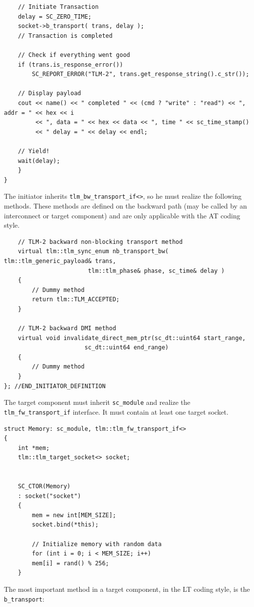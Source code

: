 \documentclass[11pt]{article}
\begin{document}
\begin{verbatim}
	// Initiate Transaction
	delay = SC_ZERO_TIME;
	socket->b_transport( trans, delay );
	// Transaction is completed

	// Check if everything went good
	if (trans.is_response_error())
	    SC_REPORT_ERROR("TLM-2", trans.get_response_string().c_str());

	// Display payload
	cout << name() << " completed " << (cmd ? "write" : "read") << ", addr = " << hex << i
	     << ", data = " << hex << data << ", time " << sc_time_stamp()
	     << " delay = " << delay << endl;

	// Yield!
	wait(delay);
    }
}
\end{verbatim}
The initiator inherits \texttt{tlm\_bw\_transport\_if<>}, so he must realize the following methods.
These methods are defined on the backward path (may be called by an interconnect or target component) and are only applicable with the AT coding style.
\begin{verbatim}
    // TLM-2 backward non-blocking transport method
    virtual tlm::tlm_sync_enum nb_transport_bw( tlm::tlm_generic_payload& trans,
						tlm::tlm_phase& phase, sc_time& delay )
	{
	    // Dummy method
	    return tlm::TLM_ACCEPTED;
	}

    // TLM-2 backward DMI method
    virtual void invalidate_direct_mem_ptr(sc_dt::uint64 start_range,
					   sc_dt::uint64 end_range)
	{
	    // Dummy method
	}
}; //END_INITIATOR_DEFINITION
\end{verbatim}
The target component must inherit \texttt{sc\_module} and realize the \texttt{tlm\_fw\_transport\_if} interface.
It must contain at least one target socket.
\begin{verbatim}
struct Memory: sc_module, tlm::tlm_fw_transport_if<>
{
    int *mem;
    tlm::tlm_target_socket<> socket;


    SC_CTOR(Memory)
	: socket("socket")
	{
	    mem = new int[MEM_SIZE];
	    socket.bind(*this);

	    // Initialize memory with random data
	    for (int i = 0; i < MEM_SIZE; i++)
		mem[i] = rand() % 256;
	}
\end{verbatim}
The most important method in a target component, in the LT coding style, is the \texttt{b\_transport}:
\end{document}
